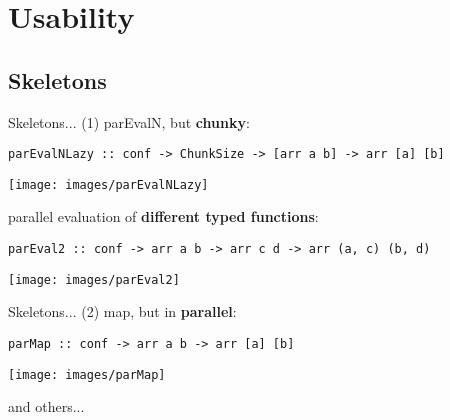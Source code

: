 \section{Usability}
\subsection{Skeletons}
\begin{frame}[fragile]{Skeletons... (1)}
parEvalN, but \textbf{chunky}:
\begin{lstlisting}[frame=htrbl]
parEvalNLazy :: conf -> ChunkSize -> [arr a b] -> arr [a] [b]
\end{lstlisting}
\begin{center}
\texttt{[image: images/parEvalNLazy]}
\end{center}
parallel evaluation of \textbf{different typed functions}:
\begin{lstlisting}[frame=htrbl]
parEval2 :: conf -> arr a b -> arr c d -> arr (a, c) (b, d)
\end{lstlisting}
\begin{center}
\texttt{[image: images/parEval2]}
\end{center}
\end{frame}
\begin{frame}[fragile]{Skeletons... (2)}
map, but in \textbf{parallel}:
\begin{lstlisting}[frame=htrbl]
parMap :: conf -> arr a b -> arr [a] [b]
\end{lstlisting}
\begin{center}
\texttt{[image: images/parMap]}
\end{center}
\begin{center}
	and others...
\end{center}
\end{frame}
